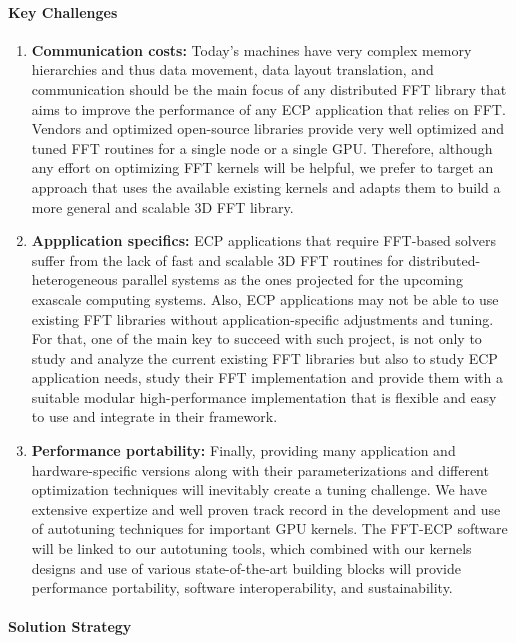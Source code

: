 \paragraph{Key  Challenges}
\begin{enumerate}
\item
\textbf{Communication costs:}
Today's machines have very complex memory hierarchies and thus data movement, 
data layout translation, and communication should be the main focus of any 
distributed FFT library that aims to improve the performance of any ECP 
application that relies on FFT. Vendors and optimized open-source libraries 
provide very well optimized and tuned FFT routines for a single node or a 
single GPU. Therefore, although any effort on optimizing FFT kernels will 
be helpful, we prefer to target an approach that uses the available existing 
kernels and adapts them to build a more general and scalable 3D FFT library.

\item
\textbf{Appplication specifics:}
ECP applications that require FFT-based solvers suffer from the lack of fast 
and scalable 3D FFT routines for distributed-heterogeneous parallel systems 
as the ones projected for the upcoming exascale computing systems. Also, ECP 
applications may not be able to use existing FFT libraries without 
application-specific adjustments and tuning. For that, one of the main key to 
succeed with such project, is not only to study and analyze the current 
existing FFT libraries but also to study ECP application needs, study their 
FFT implementation and provide them with a suitable modular high-performance 
implementation that is flexible and easy to use and integrate in their framework.

\item
\textbf{Performance portability:}
Finally, providing many application and hardware-specific versions along with 
their parameterizations and different optimization techniques will inevitably 
create a tuning challenge. We have extensive expertize and well proven track 
record in the development and use of autotuning techniques for important GPU 
kernels. The FFT-ECP software will be linked to our autotuning tools, which 
combined with our kernels designs and use of various state-of-the-art building 
blocks will provide performance portability, software interoperability, and sustainability.
\end{enumerate}

\paragraph{Solution Strategy}

